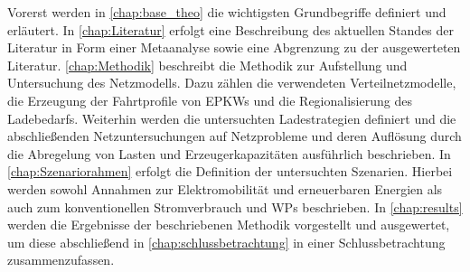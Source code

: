 Vorerst werden in \autoref{chap:base_theo} die wichtigsten Grundbegriffe definiert und erläutert.
In \autoref{chap:Literatur} erfolgt eine Beschreibung des aktuellen Standes der Literatur in Form einer Metaanalyse sowie eine Abgrenzung zu der ausgewerteten Literatur.
\autoref{chap:Methodik} beschreibt die Methodik zur Aufstellung und Untersuchung des Netzmodells.
Dazu zählen die verwendeten Verteilnetzmodelle, die Erzeugung der Fahrtprofile von \glspl{EPKW} und die Regionalisierung des Ladebedarfs.
Weiterhin werden die untersuchten Ladestrategien definiert und die abschließenden Netzuntersuchungen auf Netzprobleme und deren Auflösung durch die Abregelung von Lasten und Erzeugerkapazitäten ausführlich beschrieben.
In \autoref{chap:Szenariorahmen} erfolgt die Definition der untersuchten Szenarien.
Hierbei werden sowohl Annahmen zur Elektromobilität und erneuerbaren Energien als auch zum konventionellen Stromverbrauch und \glspl{WP} beschrieben.
In \autoref{chap:results} werden die Ergebnisse der beschriebenen Methodik vorgestellt und ausgewertet, um diese abschließend in \autoref{chap:schlussbetrachtung} in einer Schlussbetrachtung zusammenzufassen.

\clearpage
